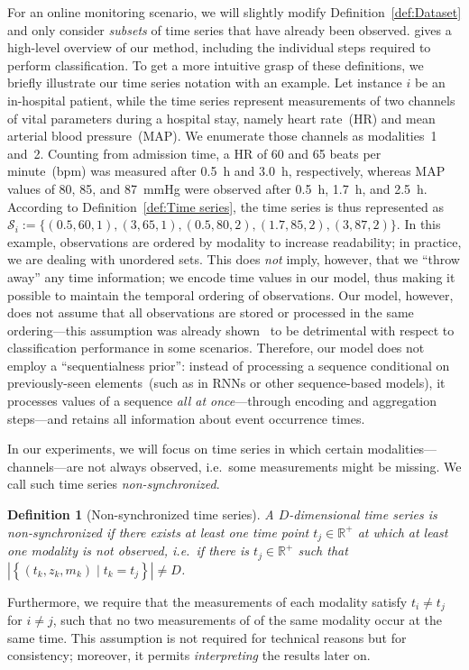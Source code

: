 \documentclass{article}
\newcommand{\real}     {\mathds{R}\xspace}
\newtheorem{definition}{Definition}
\begin{document}
For an online monitoring scenario, we will slightly modify
Definition~\ref{def:Dataset} and only consider \emph{subsets} of time
series that have already been observed.
 gives a high-level overview of our method,
including the individual steps required to perform classification.
To get a more intuitive grasp of these definitions, we briefly
illustrate our time
series notation with an example.
Let instance $i$ be an in-hospital patient, while the time series
represent measurements of two channels of vital parameters during
a hospital stay, namely heart rate~(HR) and mean arterial blood
pressure~(MAP). We enumerate those channels as modalities~1 and~2.
Counting from admission time, a HR of 60 and 65 beats per minute~(bpm) was
measured after \SI{0.5}{\hour} and \SI{3.0}{\hour}, respectively,
whereas MAP values of 80, 85, and \SI{87}{\mmHg} were observed after
\SI{0.5}{\hour}, \SI{1.7}{\hour}, and \SI{2.5}{\hour}.
According to Definition~\ref{def:Time series}, the time series is thus
represented as
$
  \mathcal{S}_i := \{
    (0.5, 60, 1 ),
    (3, 65, 1 ),\allowbreak
    (0.5, 80, 2 ),\allowbreak
    (1.7, 85, 2 ),\allowbreak
    (3, 87, 2 )
  \}.
$
In this example, observations are ordered by modality to increase
readability; in practice, we are dealing with unordered sets.
This does \emph{not} imply, however, that we ``throw away'' any time
information; we encode time values in our model, thus making it possible
to maintain the temporal ordering of observations. Our model, however,
does not assume that all observations are stored or processed in the
same ordering---this assumption was already
shown~\citep{vinyals2015order} to be detrimental with respect to
classification performance in some scenarios.
Therefore, our model does not employ a ``sequentialness prior'':
instead of processing a sequence conditional on previously-seen
elements~(such as in RNNs or other sequence-based models), it
processes values of a sequence \emph{all at once}---through encoding and
aggregation steps---and retains all information about event occurrence
times.

In our experiments, we will focus on time series in which certain
modalities---channels---are not always observed, i.e.\ some
measurements might be missing. We call such time series
\emph{non-synchronized}.
\begin{definition}[Non-synchronized time series]
  A \mbox{$D$-dimensional} time series is \emph{non-synchronized} if there
  exists at least one time point $t_{j} \in \real^{+}$ at which at least one
  modality is not observed, i.e.\ if there is $t_{j} \in \real^{+}$
  such that $\left|\left\{\left(t_{k}, z_{k}, m_{k} \right) \mid
  t_{k}=t_{j} \right\}\right| \neq D$.
\end{definition}
Furthermore, we require that the measurements of each modality satisfy
$t_i \neq t_j$ for $i \neq j$, such that no two measurements of of the
same modality occur at the same time.  This assumption is not required
for technical reasons but for consistency; moreover, it permits
\emph{interpreting} the results later on. 
\end{document}
